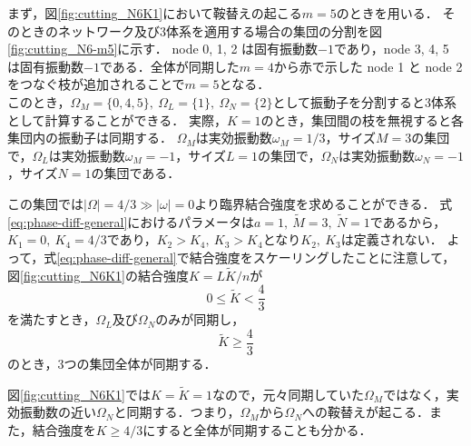 \documentclass[../main]{subfiles}
\begin{document}
まず，図\ref{fig:cutting_N6K1}において鞍替えの起こる$m=5$のときを用いる．
そのときのネットワーク及び3体系を適用する場合の集団の分割を図\ref{fig:cutting_N6-m5}に示す．
node 0, 1, 2 は固有振動数$-1$であり，node 3, 4, 5 は固有振動数$-1$である．全体が同期した$m=4$から赤で示した node 1 と node 2 をつなぐ枝が追加されることで$m=5$となる．\\
このとき，$\Omega_M=\{0,4,5\},\ \Omega_L=\{1\},\ \Omega_N=\{2\}$として振動子を分割すると3体系として計算することができる．
実際，$K=1$のとき，集団間の枝を無視すると各集団内の振動子は同期する．
$\Omega_M$は実効振動数$\omega_M=1/3$，サイズ$M=3$の集団で，$\Omega_L$は実効振動数$\omega_M=-1$，サイズ$L=1$の集団で，$\Omega_N$は実効振動数$\omega_N=-1$，サイズ$N=1$の集団である．

この集団では$|\Omega|=4/3\gg|\omega|=0$より臨界結合強度を求めることができる．
式\eqref{eq:phase-diff-general}におけるパラメータは$a=1,\ \tilde{M}=3,\ \tilde{N}=1$であるから，
$K_1=0,\ K_4=4/3$であり，$K_2>K_4,\ K_3>K_4$となり$K_2,\ K_3$は定義されない．
よって，式\eqref{eq:phase-diff-general}で結合強度をスケーリングしたことに注意して，図\ref{fig:cutting_N6K1}の結合強度$K=L\tilde{K}/n$が
\begin{equation*}
    0\leq \tilde{K}<\frac{4}{3}
\end{equation*}
を満たすとき，$\Omega_L$及び$\Omega_N$のみが同期し，
\begin{equation*}
    \tilde{K}\geq \frac{4}{3}
\end{equation*}
のとき，3つの集団全体が同期する．

図\ref{fig:cutting_N6K1}では$K=\tilde{K}=1$なので，元々同期していた$\Omega_M$ではなく，実効振動数の近い$\Omega_N$と同期する．つまり，$\Omega_M$から$\Omega_N$への鞍替えが起こる．また，結合強度を$K\geq 4/3$にすると全体が同期することも分かる．
\end{document}
